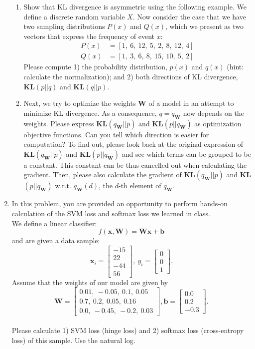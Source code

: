 \documentclass[a4paper]{article}
\begin{document}
\begin{enumerate}
\begin{enumerate}
	\item Show that KL divergence is asymmetric using the following example. We define a discrete random variable $X$. Now consider the case that we have two sampling distributions $P(x)$ and $Q(x)$, which we present as two vectors that express the frequency of event $x$:
	\begin{align*}
		P(x) & = [1,\ 6,\ 12,\ 5,\ 2,\ 8,\ 12,\ 4]\\
		Q(x) & = [1,\ 3,\ 6,\ 8,\ 15,\ 10,\ 5,\ 2]
	\end{align*}
	Please compute 1) the probability distribution, $p(x)$ and $q(x)$ (hint: calculate the normalization); and 2) both directions of KL divergence, \textbf{KL}$(p||q)$ and \textbf{KL}$(q||p)$.
	\item Next, we try to optimize the weights $\bm{W}$ of a model in an attempt to minimize KL divergence. As a consequence, $q=q_{\bm{W}}$ now depends on the weights. Please express \textbf{KL}$(q_{\bm{W}}||p)$ and  \textbf{KL}$(p||q_{\bm{W}})$ as optimization objective functions. Can you tell which direction is easier for computation? To find out, please look back at the original expression of \textbf{KL}$(q_{\bm{W}}||p)$ and \textbf{KL}$(p||q_{\bm{W}})$ and see which terms can be grouped to be a constant. This constant can be thus cancelled out when calculating the gradient. Then, please also calculate the gradient of \textbf{KL}$(q_{\bm{W}}||p)$ and  \textbf{KL}$(p||q_{\bm{W}})$ w.r.t. $q_{\bm{W}}(d)$, the $d$-th element of $q_{\bm{W}}$.

\end{enumerate}

\item In this problem, you are provided an opportunity to perform hands-on calculation of the SVM loss and softmax loss we learned in class.\\
We define a linear classifier: $$f(\bm{x}, \bm{W}) = \bm{W}\bm{x}+\bm{b}$$ and are given a data sample: $$\bm{x}_i = \begin{bmatrix}-15\\ 22\\ -44\\ 56 \end{bmatrix},\ y_i=\begin{bmatrix}
0 \\ 0 \\ 1
\end{bmatrix}.$$ 
Assume that the weights of our model are given by $$\bm{W}=\begin{bmatrix}0.01,\ -0.05,\ 0.1,\ 0.05\\ 0.7,\ 0.2,\ 0.05,\ 0.16\\0.0,\ -0.45,\ -0.2,\ 0.03\end{bmatrix}, \bm{b}=\begin{bmatrix}0.0\\ 0.2\\ -0.3\end{bmatrix}.$$\\
Please calculate 1) SVM loss (hinge loss) and 2) softmax loss (cross-entropy loss) of this sample. Use the natural log.

\end{enumerate}
\end{document}

